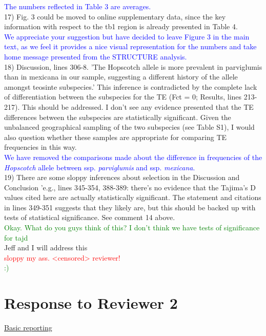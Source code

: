 \documentclass[11pt]{article}
\newcommand{\res}[1]{\noindent \textcolor{blue}{{#1}} \\}
\newcommand{\jri}[1]{\noindent \textcolor{red}{{#1}} \\}
\newcommand{\lev}[1]{\noindent \textcolor{green}{{#1}} \\}
\newcommand{\mbh}[1]{\noindent \textcolor{Dandelion}{{#1}}\\}
\begin{document}
\res{The numbers reflected in Table 3 are averages.}

17) Fig. 3 could be moved to online supplementary data, since the key information with respect to the tb1 region is already presented in Table 4. \\

\res{We appreciate your suggestion but have decided to leave Figure 3 in the main text, as we feel it provides a nice visual representation for the numbers and take home message presented from the STRUCTURE analysis.}

18) Discussion, lines 306-8. 'The Hopscotch allele is more prevalent in parviglumis than in mexicana in our sample, suggesting a different history of the allele amongst teosinte subspecies.' This inference is contradicted by the complete lack of differentiation between the subspecies for the TE (Fct = 0; Results, lines 213-217). This should be addressed. I don't see any evidence presented that the TE differences between the subspecies are statistically significant. Given the unbalanced geographical sampling of the two subspecies (see Table S1), I would also question whether these samples are appropriate for comparing TE frequencies in this way. \\

\res{We have removed the comparisons made about the difference in frequencies of the \emph{Hopscotch} allele between ssp. \emph{parviglumis} and ssp. \emph{mexicana}.}

19) There are some sloppy inferences about selection in the Discussion and Conclusion 'e.g., lines 345-354, 388-389: there's no evidence that the Tajima's D values cited here are actually statistically significant. The statement and citations in lines 349-351 suggests that they likely are, but this should be backed up with tests of statistical significance. See comment 14 above.\\

\lev{Okay. What do you guys think of this? I don't think we have tests of significance for tajd}

\mbh{Jeff and I will address this}
\jri{sloppy my ass. <censored> reviewer!}
\lev{ :) }


\section*{Response to Reviewer 2} 

\underline{Basic reporting}\\
\end{document}
